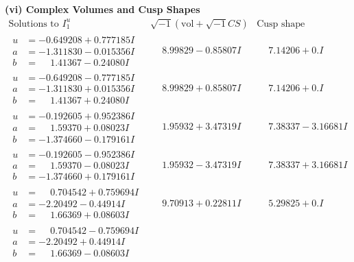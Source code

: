 \documentclass[1p]{elsarticle_modified}
\theoremstyle{definition}
\newcommand{\I}{\sqrt{-1}}
\begin{document}
\newpage\flushleft \textbf{(vi) Complex Volumes and Cusp Shapes}
$$\begin{array}{c|c|c}  
\text{Solutions to }I^u_{1}& \I (\text{vol} + \sqrt{-1}CS) & \text{Cusp shape}\\
 \hline 
\begin{aligned}
u &= -0.649208 + 0.777185 I \\
a &= -1.311830 - 0.015356 I \\
b &= \phantom{-}1.41367 - 0.24080 I\end{aligned}
 & \phantom{-}8.99829 - 0.85807 I & \phantom{-}7.14206 + 0. I\phantom{ +0.000000I} \\ \hline\begin{aligned}
u &= -0.649208 - 0.777185 I \\
a &= -1.311830 + 0.015356 I \\
b &= \phantom{-}1.41367 + 0.24080 I\end{aligned}
 & \phantom{-}8.99829 + 0.85807 I & \phantom{-}7.14206 + 0. I\phantom{ +0.000000I} \\ \hline\begin{aligned}
u &= -0.192605 + 0.952386 I \\
a &= \phantom{-}1.59370 + 0.08023 I \\
b &= -1.374660 - 0.179161 I\end{aligned}
 & \phantom{-}1.95932 + 3.47319 I & \phantom{-}7.38337 - 3.16681 I \\ \hline\begin{aligned}
u &= -0.192605 - 0.952386 I \\
a &= \phantom{-}1.59370 - 0.08023 I \\
b &= -1.374660 + 0.179161 I\end{aligned}
 & \phantom{-}1.95932 - 3.47319 I & \phantom{-}7.38337 + 3.16681 I \\ \hline\begin{aligned}
u &= \phantom{-}0.704542 + 0.759694 I \\
a &= -2.20492 - 0.44914 I \\
b &= \phantom{-}1.66369 + 0.08603 I\end{aligned}
 & \phantom{-}9.70913 + 0.22811 I & \phantom{-}5.29825 + 0. I\phantom{ +0.000000I} \\ \hline\begin{aligned}
u &= \phantom{-}0.704542 - 0.759694 I \\
a &= -2.20492 + 0.44914 I \\
b &= \phantom{-}1.66369 - 0.08603 I\end{aligned}

\end{array}$$
\end{document}
